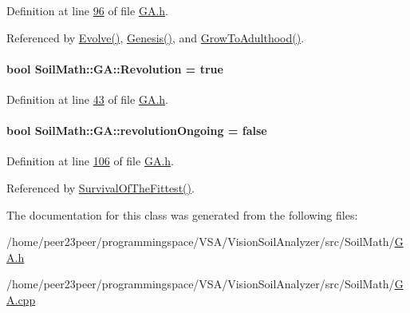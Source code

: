 Definition at line \hyperlink{_g_a_8h_source_l00096}{96} of file \hyperlink{_g_a_8h_source}{G\+A.\+h}.



Referenced by \hyperlink{_g_a_8cpp_source_l00023}{Evolve()}, \hyperlink{_g_a_8cpp_source_l00050}{Genesis()}, and \hyperlink{_g_a_8cpp_source_l00152}{Grow\+To\+Adulthood()}.

\hypertarget{class_soil_math_1_1_g_a_a2f3a405dfd8e11eecf581e66e7418d40}{}
\paragraph[{Revolution}]{\setlength{\rightskip}{0pt plus 5cm}bool Soil\+Math\+::\+G\+A\+::\+Revolution = true}\label{class_soil_math_1_1_g_a_a2f3a405dfd8e11eecf581e66e7418d40}


Definition at line \hyperlink{_g_a_8h_source_l00043}{43} of file \hyperlink{_g_a_8h_source}{G\+A.\+h}.

\hypertarget{class_soil_math_1_1_g_a_a8883b6114388bb8a992b7f057ec565a8}{}
\paragraph[{revolution\+Ongoing}]{\setlength{\rightskip}{0pt plus 5cm}bool Soil\+Math\+::\+G\+A\+::revolution\+Ongoing = false\hspace{0.3cm}{\ttfamily [private]}}\label{class_soil_math_1_1_g_a_a8883b6114388bb8a992b7f057ec565a8}


Definition at line \hyperlink{_g_a_8h_source_l00106}{106} of file \hyperlink{_g_a_8h_source}{G\+A.\+h}.



Referenced by \hyperlink{_g_a_8cpp_source_l00189}{Survival\+Of\+The\+Fittest()}.



The documentation for this class was generated from the following files\+:\begin{DoxyCompactItemize}
\item 
/home/peer23peer/programmingspace/\+V\+S\+A/\+Vision\+Soil\+Analyzer/src/\+Soil\+Math/\hyperlink{_g_a_8h}{G\+A.\+h}\item 
/home/peer23peer/programmingspace/\+V\+S\+A/\+Vision\+Soil\+Analyzer/src/\+Soil\+Math/\hyperlink{_g_a_8cpp}{G\+A.\+cpp}\end{DoxyCompactItemize}
